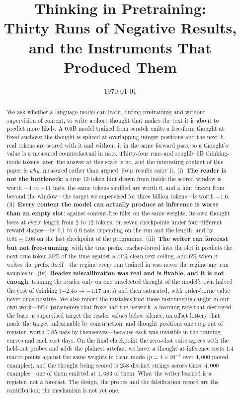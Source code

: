 \documentclass{article} %
\title{Thinking in Pretraining:\\ Thirty Runs of Negative Results, and the Instruments That Produced Them}
\author{}
\date{\today}
\begin{document}
\maketitle

\begin{abstract}
We ask whether a language model can learn, during pretraining and without supervision of content, to write a short thought that makes the text it is about to predict more likely. A 0.6B model trained from scratch emits a free-form thought at fixed anchors; the thought is spliced at overlapping integer positions and the next $k$ real tokens are scored with it and without it in the same forward pass, so a thought's value is a measured counterfactual in nats. Thirty-four runs and roughly $5$B thinking-mode tokens later, the answer at this scale is no, and the interesting content of this paper is \emph{why}, measured rather than argued. Four results carry it. (i)~\textbf{The reader is not the bottleneck}: a true $12$-token hint drawn from inside the scored window is worth $+4$ to $+11$ nats, the same tokens shuffled are worth $0$, and a hint drawn from beyond the window---the target we supervised for three billion tokens---is worth $-1.6$. (ii)~\textbf{Every content the model can actually produce at inference is worse than an empty slot}: against content-free filler on the same weights, its own thought loses at every length from $2$ to $12$ tokens, on seven checkpoints under four different reward shapes---by $0.1$ to $0.9$ nats depending on the run and the length, and by $0.81 \pm 0.08$ on the last checkpoint of the programme. (iii)~\textbf{The writer can forecast but not free-running}: with the true prefix teacher-forced into the slot it predicts the next true token $30\%$ of the time against a $41\%$ clean-text ceiling, and $6\%$ when it writes the prefix itself---the regime every run trained in was never the regime any run samples in. (iv)~\textbf{Reader miscalibration was real and is fixable, and it is not enough}: training the reader only on one unselected thought of the model's own halved the cost of thinking ($-2.45 \to -1.17$ nats) and then saturated, with order-borne value never once positive. We also report the mistakes that these instruments caught in our own work---bf16 parameters that froze half the network, a learning rate that destroyed the base, a supervised target the reader values below silence, an offset lottery that made the target unlearnable by construction, and thought positions one step out of register, worth $0.85$ nats by themselves---because each was invisible in the training curves and each cost days. On the final checkpoint the zero-shot suite agrees with the held-out probes and adds the plainest artefact we have: a thought at inference costs $1.4$ macro points against the same weights in clean mode ($p = 4\times10^{-4}$ over $4{,}000$ paired examples), and the thought being scored is $258$ distinct strings across those $4{,}000$ examples---one of them emitted at $1{,}083$ of them. What the writer learned is a register, not a forecast. The design, the probes and the falsification record are the contribution; the mechanism is not yet one.
\end{abstract}
\end{document}

